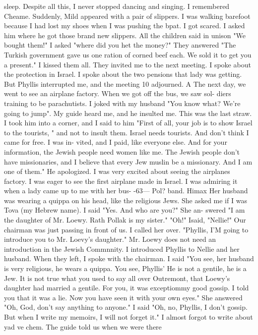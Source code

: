 sleep. Despite all this, I never stopped dancing and singing. I remembered Cheame. 
Suddenly, Mild appeared with a pair of slippers. I was walking barefoot because I 
had lost my shoes when I was pushing the bpat. I got scared. I asked him where he got 
those brand new slippers. All the children said in unison "We bought them!" I asked 
"where did you het the money?" They answered "The Turkish government gave us one ration of 
% 
corned beef each. We sold it to get you a present." I kissed them all. 
They invited me to the next meeting. I spoke about the protection in Israel. I spoke 
about the two pensions that lady was getting. But Phyllis interrupted me, and the meeting 10 
adjourned. 
A 
The next day, we went to see an airplane factory. When we got off the bus, we saw sol-
diers training to be parachutists. I joked with my husband "You know what? We're going 
to jump". My guide heard me, and he insulted me. This was the last straw. I took him 
into a corner, and I said to him "First of all, your job is to show Israel to the tourists, " 
and not to insult them. Israel needs tourists. And don't think I came for free. I was in-
vited, and I paid, like everyone else. And for your information, the Jewish people need 
women like me. The Jewish people don't have missionaries, and I believe that every Jew muslin 
be a missionary. And I am one of them." He apologized. 
I was very excited about seeing the airplanes factory. I was eager to see the first 
airplane made in Israel. I was admiring it when a lady came up to me with her bus-
-63— 
Pol? 
band. Himax Her husband was wearing a quippa on his head, like the religious Jews. 
She asked me if I was Tova (my Hebrew name). I said "Yes. And who are you?" She an-
swered "I am the daughter of Mr. Loewy. Rath Pollak is my sister." "Oh!" Isaid, "Nellie!" 
Our chairman was just passing in front of us. I called her over. "Phyllis, I'M going to 
introduce you to Mr. Loevy's daughter." Mr. Loewy does not need an introduction in the 
Jewish Commnnity. I introduced Phyllis to Nellie and her husband. When they left, I 
spoke with the chairman. I said "You see, her husband is very religious, he wears a 
quippa. You see, Phyllis' He is not a gentile, he is a Jew. It is not true what you 
used to say all over Outremont, that Loewy's daughter had married a gentile. For you, it 
was exceptiommy good gossip. I told you that it was a lie. Now you have seen it with 
your own eyes." She answered "Oh, God, don't say anything to anyone." I said "Oh, no, 
Phyllis, I don't gossip. But when I write my memoirs, I will not forget it." 
I almost forgot to write about yad ve chem. The guide told us when we were there 
